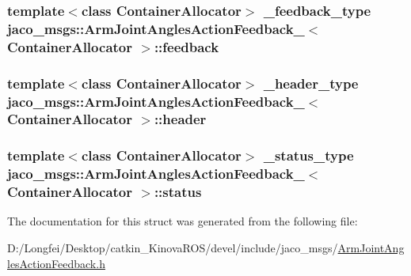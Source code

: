\subsubsection[{\texorpdfstring{feedback}{feedback}}]{\setlength{\rightskip}{0pt plus 5cm}template$<$class Container\+Allocator$>$ {\bf \+\_\+feedback\+\_\+type} {\bf jaco\+\_\+msgs\+::\+Arm\+Joint\+Angles\+Action\+Feedback\+\_\+}$<$ Container\+Allocator $>$\+::feedback}\hypertarget{structjaco__msgs_1_1ArmJointAnglesActionFeedback___a1bdadb7a4a611607e135e734a94fb74a}{}\label{structjaco__msgs_1_1ArmJointAnglesActionFeedback___a1bdadb7a4a611607e135e734a94fb74a}
\subsubsection[{\texorpdfstring{header}{header}}]{\setlength{\rightskip}{0pt plus 5cm}template$<$class Container\+Allocator$>$ {\bf \+\_\+header\+\_\+type} {\bf jaco\+\_\+msgs\+::\+Arm\+Joint\+Angles\+Action\+Feedback\+\_\+}$<$ Container\+Allocator $>$\+::header}\hypertarget{structjaco__msgs_1_1ArmJointAnglesActionFeedback___a2b6e6babc148c8a60d9c87aec1345010}{}\label{structjaco__msgs_1_1ArmJointAnglesActionFeedback___a2b6e6babc148c8a60d9c87aec1345010}
\subsubsection[{\texorpdfstring{status}{status}}]{\setlength{\rightskip}{0pt plus 5cm}template$<$class Container\+Allocator$>$ {\bf \+\_\+status\+\_\+type} {\bf jaco\+\_\+msgs\+::\+Arm\+Joint\+Angles\+Action\+Feedback\+\_\+}$<$ Container\+Allocator $>$\+::status}\hypertarget{structjaco__msgs_1_1ArmJointAnglesActionFeedback___a3ad6f5a7e798c60a78a6ffcb225a20a0}{}\label{structjaco__msgs_1_1ArmJointAnglesActionFeedback___a3ad6f5a7e798c60a78a6ffcb225a20a0}


The documentation for this struct was generated from the following file\+:\begin{DoxyCompactItemize}
\item 
D\+:/\+Longfei/\+Desktop/catkin\+\_\+\+Kinova\+R\+O\+S/devel/include/jaco\+\_\+msgs/\hyperlink{ArmJointAnglesActionFeedback_8h}{Arm\+Joint\+Angles\+Action\+Feedback.\+h}\end{DoxyCompactItemize}
